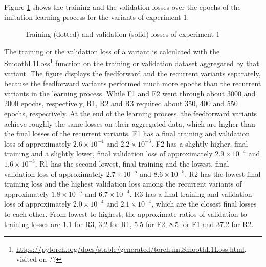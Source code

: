 Figure \ref{fig:e1_learn} shows the 
training and the validation losses
over the epochs of the imitation learning process 
for the variants of experiment 1.
\begin{figure}
    \centering
    \hspace*{0cm}
    \par
    \caption[
        Training and validation losses of experiment 1
    ]{
        Training (dotted) and validation (solid) losses of experiment 1
        \label{fig:e1_learn}
    }
\end{figure}
The training or the validation loss of a variant is calculated with the SmoothL1Loss\footnote{
    \url{https://pytorch.org/docs/stable/generated/torch.nn.SmoothL1Loss.html}, visited on ??
}
function on the training or validation dataset aggregated by that variant.
The figure displays the feedforward and the recurrent variants separately,
because the feedforward variants performed much more epochs than the recurrent variants in the learning process.
While F1 and F2 went through about 3000 and 2000 epochs, respectively,
R1, R2 and R3 required about 350, 400 and 550 epochs, respectively.
At the end of the learning process,
the feedforward variants achieve roughly the same losses on their aggregated data,
which are higher than the final losses of the recurrent variants.
F1 has a final training and validation loss of 
approximately $2.6\times 10^{-4}$ and $2.2\times 10^{-3}$.
F2 has a slightly higher, final training and a slightly lower, final validation loss of approximately
$2.9\times 10^{-4}$ and $1.6\times 10^{-3}$.
R1 has the second lowest, final training and the lowest, final validation
loss of approximately $2.7\times 10^{-5}$ and $8.6\times 10^{-5}$.
R2 has the lowest final training loss and 
the highest validation loss among the recurrent variants 
of approximately $1.8\times 10^{-5}$ and $6.7\times 10^{-4}$.
R3 has a final training and validation loss of approximately $2.0\times 10^{-4}$ and $2.1\times 10^{-4}$,
which are the closest final losses to each other.
From lowest to highest,
the approximate ratios of validation to training losses are 
1.1 for R3,
3.2 for R1,
5.5 for F2,
8.5 for F1 
and 37.2 for R2.


